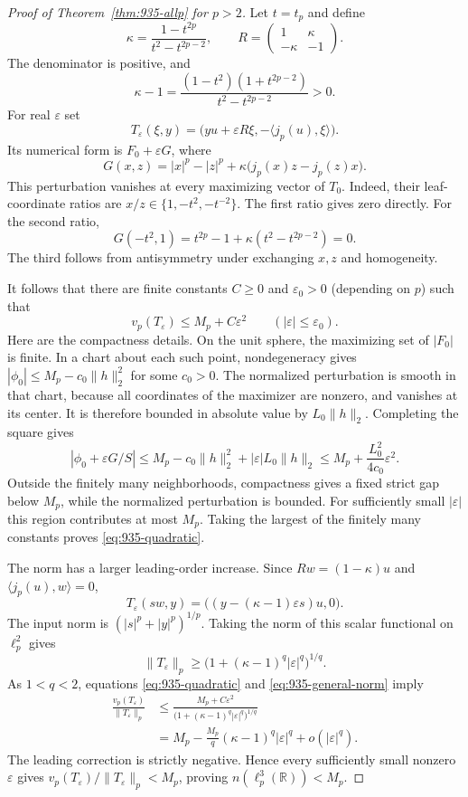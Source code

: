 \documentclass[11pt,a4paper]{article}
\theoremstyle{remark}
\begin{document}
\begin{proof}[Proof of Theorem~\ref{thm:935-allp} for $p>2$]
Let $t=t_p$ and define
\[
 \kappa=\frac{1-t^{2p}}{t^2-t^{2p-2}},\qquad
 R=\begin{pmatrix}1&\kappa\\-\kappa&-1\end{pmatrix}.
\]
The denominator is positive, and
\[
 \kappa-1
 =\frac{(1-t^2)(1+t^{2p-2})}{t^2-t^{2p-2}}>0.
 \tag{935.G4}\label{eq:935-kappa}
\]
For real $\varepsilon$ set
\[
 T_\varepsilon(\xi,y)
 =\bigl(yu+\varepsilon R\xi,-\langle j_p(u),\xi\rangle\bigr).
 \tag{935.G5}\label{eq:935-family}
\]
Its numerical form is $F_0+\varepsilon G$, where
\[
 G(x,z)=|x|^p-|z|^p
       +\kappa\bigl(j_p(x)z-j_p(z)x\bigr).
 \tag{935.G6}\label{eq:935-perturbation}
\]
This perturbation vanishes at every maximizing vector of $T_0$.
Indeed, their leaf-coordinate ratios are
$x/z\in\{1,-t^2,-t^{-2}\}$. The first ratio gives zero directly. For the
second ratio,
\[
 G(-t^2,1)=t^{2p}-1+\kappa(t^2-t^{2p-2})=0.
\]
The third follows from antisymmetry under exchanging $x,z$ and homogeneity.

It follows that there are finite constants $C\ge0$ and $\varepsilon_0>0$
(depending on $p$) such that
\[
 v_p(T_\varepsilon)\le M_p+C\varepsilon^2
 \qquad(|\varepsilon|\le\varepsilon_0).
 \tag{935.G7}\label{eq:935-quadratic}
\]
Here are the compactness details. On the unit sphere, the maximizing set
of $|F_0|$ is finite. In a chart about each such point, nondegeneracy gives
$|\phi_0|\le M_p-c_0\|h\|_2^2$ for some $c_0>0$. The normalized
perturbation is smooth in that chart, because all coordinates of the
maximizer are nonzero, and vanishes at its center. It is therefore bounded
in absolute value by $L_0\|h\|_2$. Completing the square gives
\[
 |\phi_0+\varepsilon G/S|
 \le M_p-c_0\|h\|_2^2+|\varepsilon|L_0\|h\|_2
 \le M_p+\frac{L_0^2}{4c_0}\varepsilon^2.
\]
Outside the finitely many neighborhoods, compactness gives a fixed strict
gap below $M_p$, while the normalized perturbation is bounded. For
sufficiently small $|\varepsilon|$ this region contributes at most $M_p$.
Taking the largest of the finitely many constants proves
\eqref{eq:935-quadratic}.

The norm has a larger leading-order increase. Since
$Rw=(1-\kappa)u$ and $\langle j_p(u),w\rangle=0$,
\[
 T_\varepsilon(sw,y)
 =\bigl((y-(\kappa-1)\varepsilon s)u,0\bigr).
\]
The input norm is $(|s|^p+|y|^p)^{1/p}$. Taking the norm of this scalar
functional on $\ell_p^2$ gives
\[
 \|T_\varepsilon\|_p
 \ge\bigl(1+(\kappa-1)^q|\varepsilon|^q\bigr)^{1/q}.
 \tag{935.G8}\label{eq:935-general-norm}
\]
As $1<q<2$, equations \eqref{eq:935-quadratic} and
\eqref{eq:935-general-norm} imply
\[
 \begin{split}
 \frac{v_p(T_\varepsilon)}{\|T_\varepsilon\|_p}
 &\le\frac{M_p+C\varepsilon^2}
 {\bigl(1+(\kappa-1)^q|\varepsilon|^q\bigr)^{1/q}}\\
 &=M_p-\frac{M_p}{q}(\kappa-1)^q|\varepsilon|^q
      +o(|\varepsilon|^q).
 \end{split}
\]
The leading correction is strictly negative. Hence every sufficiently
small nonzero $\varepsilon$ gives
$v_p(T_\varepsilon)/\|T_\varepsilon\|_p<M_p$, proving
$n(\ell_p^3(\mathbb R))<M_p$.
\end{proof}
\end{document}
